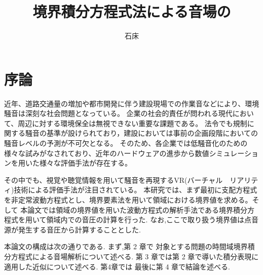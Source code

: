 \documentclass[dvipdfmx]{ampbt}
\title{境界積分方程式法による音場の}     %
      {数値解析と移動する受音点における}      %
      {リアルタイム可聴化について}                %
\author{石床}{竜一}             %
\begin{document}
\ifoutputbody
\makeinsidecover                %
\makeabstract                   %
\maketoc                        %
\setcounter{page}{1}            %
\section{序論}
近年、道路交通量の増加や都市開発に伴う建設現場での作業音などにより、環境騒音は深刻な社会問題となっている。
企業の社会的責任が問われる現代において、周辺に対する環境保全は無視できない重要な課題である。
法令でも規制に関する騒音の基準が設けられており，建設においては事前の企画段階においての騒音レベルの予測が不可欠となる。
そのため、各企業では低騒音化のための様々な試みがなされており、近年のハードウェアの進歩から数値シミュレーションを用いた様々な評価手法が存在する。

その中でも、視覚や聴覚情報を用いて騒音を再現するVR(バーチャル　リアリティ)技術による評価手法が注目されている。
本研究では、まず最初に支配方程式を非定常波動方程式とし、境界要素法を用いて領域における境界値を求める。そして
本論文では領域の境界値を用いた波動方程式の解析手法である境界積分方程式を用いて領域内での音圧の計算を行った.
なお,ここで取り扱う境界値は点音源が発生する音圧から計算することとした.\par

本論文の構成は次の通りである.
 まず,第 2 章で 対象とする問題の時間域境界積分方程式による音場解析について述べる.
 第 3 章では第 2 章で導いた積分表現に適用した近似について述べる.
第4章では
 最後に第 4 章で結論を述べる.
\end{document}
